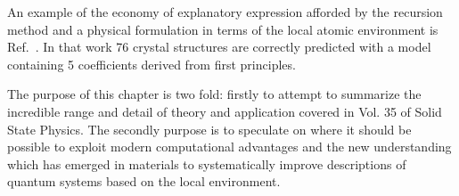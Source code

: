 
An example of the economy of explanatory expression afforded by the recursion method
and a physical formulation in terms of the local atomic environment
is Ref.~\cite{johannes76}. In that work 76 crystal structures are correctly predicted 
with a model containing 5 coefficients derived from first principles.

The purpose of this chapter is two fold: firstly to attempt to summarize the incredible range and
detail of theory and application covered in Vol. 35 of Solid State Physics. The secondly
purpose is to speculate on where it should be possible to exploit modern 
computational advantages and the new understanding which has emerged in materials 
to systematically improve descriptions of quantum systems based
on the local environment. 

